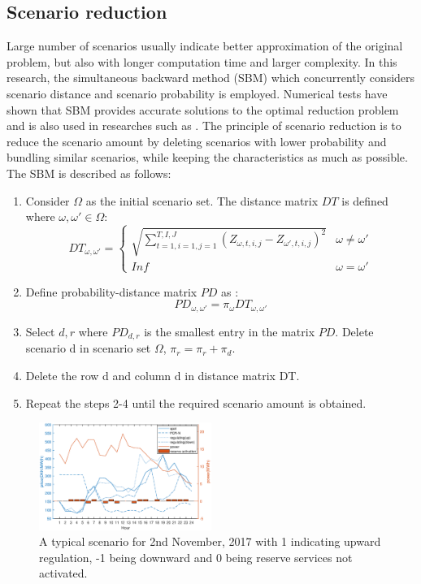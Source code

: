 \documentclass[final,5p,times,twocolumn,authoryear]{elsarticle}
\begin{document}
\subsection{Scenario reduction}
Large number of scenarios usually indicate better approximation of the original problem, but also with longer computation time and larger complexity. In this research, the simultaneous backward method (SBM) which concurrently considers scenario distance and scenario probability is employed. Numerical tests have shown that SBM provides accurate solutions to the optimal reduction problem \cite{1304379} and is also used in researches such as \cite{Niknam2012AnOperation}. The principle of scenario reduction is to reduce the scenario amount by deleting scenarios with lower probability and bundling similar scenarios, while keeping the characteristics as much as possible. The SBM is described as follows:
\begin{enumerate}
    \item Consider $\Omega$ as the initial scenario set. The distance matrix $DT$ is defined where $\omega, \omega' \in  \Omega$:
    \begin{equation} \label{eq:scenarioDistance}
DT_{\omega,\omega'}  = \left\{
\begin{array}{ll}
\sqrt{ \sum_{t =1, i = 1, j = 1}^{T,I,J}(Z_{\omega,t,i,j}-Z_{\omega',t,i,j})^2} &{ \omega \neq \omega'}\\
 Inf & {\omega = \omega'}
\end{array} \right.
    \end{equation}
    \item Define probability-distance matrix $PD$ as :
    \begin{equation}
    PD_{\omega,\omega'} = \pi_\omega DT_{\omega,\omega'}    
    \end{equation}
    \item   Select $d, r$ where $PD_{d,r}$ is the smallest entry in the matrix $PD$. Delete scenario d in scenario set $\Omega$, $\pi_r = \pi_r + \pi_d$.
    \item Delete the row d and column d in distance matrix DT.
    \item Repeat the steps 2-4 until the required scenario amount is obtained.
\end{enumerate}

\begin{figure}
    \centering
    \includegraphics[width=0.5\textwidth]{figures/scenario.eps}
    \caption{A typical scenario for 2nd November, 2017 with 1 indicating upward regulation, -1 being downward and 0 being reserve services not activated.}
    \label{fig:scenario}
\end{figure}
\end{document}
